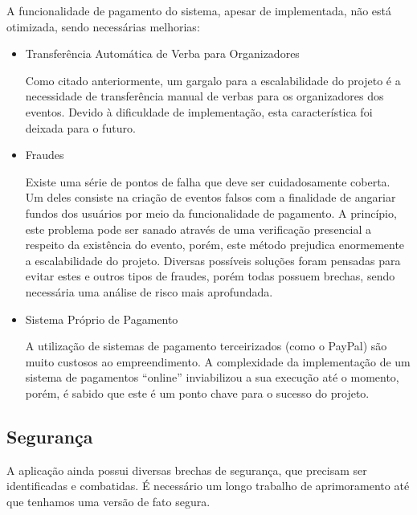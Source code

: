 A funcionalidade de pagamento do sistema, apesar de implementada, não está otimizada, sendo necessárias melhorias:

\begin{itemize}
\item Transferência Automática de Verba para Organizadores

Como citado anteriormente, um gargalo para a escalabilidade do projeto é a necessidade de transferência manual de verbas para os organizadores dos eventos. Devido à dificuldade de implementação, esta característica foi deixada para o futuro.

\item Fraudes

Existe uma série de pontos de falha que deve ser cuidadosamente coberta. Um deles consiste na criação de eventos falsos com a finalidade de angariar fundos dos usuários por meio da funcionalidade de pagamento. A princípio, este problema pode ser sanado através de uma verificação presencial a respeito da existência do evento, porém, este método prejudica enormemente a escalabilidade do projeto. Diversas possíveis soluções foram pensadas para evitar estes e outros tipos de fraudes, porém todas possuem brechas, sendo necessária uma análise de risco mais aprofundada.

\item Sistema Próprio de Pagamento

A utilização de sistemas de pagamento terceirizados (como o PayPal) são muito custosos ao empreendimento. A complexidade da implementação de um sistema de pagamentos “online” inviabilizou a sua execução até o momento, porém, é sabido que este é um ponto chave para o sucesso do projeto.

\end{itemize}

\subsection{Segurança}

A aplicação ainda possui diversas brechas de segurança, que precisam ser identificadas e combatidas. É necessário um longo trabalho de aprimoramento até que tenhamos uma versão de fato segura.

